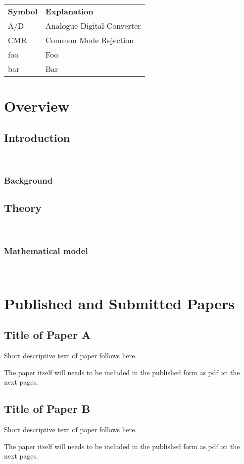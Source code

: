 \documentclass[11pt,a4paper,openright]{book} %
\begin{document}
\begin{longtable}{ll}
  \textbf{Symbol} & \textbf{Explanation}\endhead\\
  A/D	& Analogue-Digital-Converter \\
  CMR	& Common Mode Rejection \\
  foo	& Foo \\
  bar 	& Bar
\end{longtable}


\mainmatter
\part{Overview}
\label{part:overview}
\chapter{Introduction}
\label{intro}
\
\section{Background}
\label{sec:back}
\lipsum

\chapter{Theory}
\label{intro}
\
\section{Mathematical model}
\label{sec:back}
\lipsum


~\nocite{*}

\cleardoublepage
{}



\appendix
\renewcommand{\appendixname}{Paper} %

\part{Published and Submitted Papers}
\label{part:papers}


\chapter{Title of Paper A}
\label{paper-a}

Short descriptive text of paper follows here.

The paper itself will needs to be included in the published form as pdf on the next pages.

\chapter{Title of Paper B}
\label{paper-b}
Short descriptive text of paper follows here.

The paper itself will needs to be included in the published form as pdf on the next pages.
\end{document}
